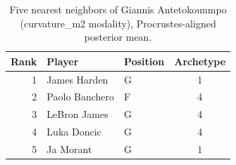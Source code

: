 \begin{table}[htbp]
  \centering\small
  \begin{tabular}{rllc}
    \toprule
    Rank & Player & Position & Archetype \\
    \midrule
    1 & James Harden & G & 1 \\
    2 & Paolo Banchero & F & 4 \\
    3 & LeBron James & G & 4 \\
    4 & Luka Doncic & G & 4 \\
    5 & Ja Morant & G & 1 \\
    \bottomrule
  \end{tabular}
  \caption{Five nearest neighbors of Giannis Antetokounmpo (curvature_m2 modality), Procrustes-aligned posterior mean.}
  \label{tab:Giannis_Antetokounmpo_neighbors_curvature_m2}
\end{table}

